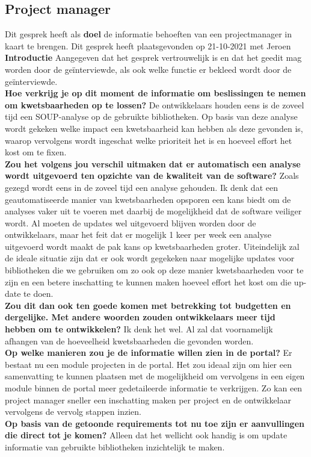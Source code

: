 \subsection{Project manager}\label{subsec:project-manager}
Dit gesprek heeft als \textbf{doel} de informatie behoeften van een projectmanager in kaart te brengen. Dit gesprek heeft plaatsgevonden op 21-10-2021 met Jeroen
\\
\textbf{Introductie }
Aangegeven dat het gesprek vertrouwelijk is en dat het ge\-edit mag worden door de geïnterviewde, als ook welke functie er bekleed wordt door de geïnterviewde.
\\
\textbf{Hoe verkrijg je op dit moment de informatie om beslissingen te nemen om kwetsbaarheden op te lossen? }
De ontwikkelaars houden eens is de zoveel tijd een SOUP-analyse op de gebruikte bibliotheken. Op basis van deze analyse wordt gekeken welke impact een kwetsbaarheid kan hebben als deze gevonden is, waarop vervolgens wordt ingeschat welke prioriteit het is en hoeveel effort het kost om te fixen.
\\
\textbf{Zou het volgens jou verschil uitmaken dat er automatisch een analyse wordt uitgevoerd ten opzichte van de kwaliteit van de software? }Zoals gezegd wordt eens in de zoveel tijd een analyse gehouden. Ik denk dat een geautomatiseerde manier van kwetsbaarheden opsporen een kans biedt om de analyses vaker uit te voeren met daarbij de mogelijkheid dat de software veiliger wordt. Al moeten de updates wel uitgevoerd blijven worden door de ontwikkelaars, maar het feit dat er mogelijk 1 keer per week een analyse uitgevoerd wordt maakt de pak kans op kwetsbaarheden groter. Uiteindelijk zal de ideale situatie zijn dat er ook wordt gegekeken naar mogelijke updates voor bibliotheken die we gebruiken om zo ook op deze manier kwetsbaarheden voor te zijn en een betere inschatting te kunnen maken hoeveel effort het kost om die up-date te doen.
\\

\textbf{Zou dit dan ook ten goede komen met betrekking tot budgetten en dergelijke. Met andere woorden zouden ontwikkelaars meer tijd hebben om te ontwikkelen?} Ik denk het wel. Al zal dat voornamelijk afhangen van de hoeveelheid kwetsbaarheden die gevonden worden.
\\
\textbf{Op welke manieren zou je de informatie willen zien in de portal?} Er bestaat nu een module projecten in de portal. Het zou ideaal zijn om hier een samenvatting te kunnen plaatsen met de mogelijkheid om vervolgens in een eigen module binnen de portal meer gedetaileerde informatie te verkrijgen. Zo kan een project manager sneller een inschatting maken per project en de ontwikkelaar vervolgens de vervolg stappen inzien.
\\
\textbf{Op basis van de getoonde requirements tot nu toe zijn er aanvullingen die direct tot je komen?} Alleen dat het wellicht ook handig is om update informatie van gebruikte bibliotheken inzichtelijk te maken.
